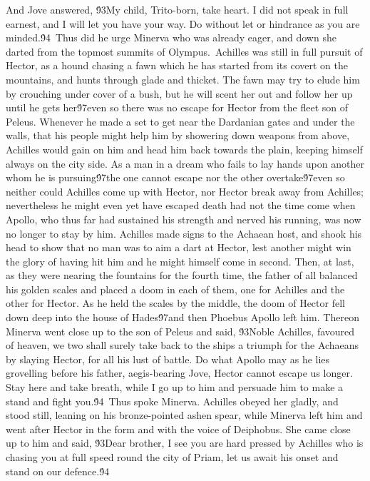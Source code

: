 {And Jove answered, \'93My child, Trito-born, take heart. I did not speak in full earnest, and I will let you have your way. Do without let or hindrance as you are minded.\'94\
Thus did he urge Minerva who was already eager, and down she darted from the topmost summits of Olympus.\
Achilles was still in full pursuit of Hector, as a hound chasing a fawn which he has started from its covert on the mountains, and hunts through glade and thicket. The fawn may try to elude him by crouching under cover of a bush, but he will scent her out and follow her up until he gets her\'97even so there was no escape for Hector from the fleet son of Peleus. Whenever he made a set to get near the Dardanian gates and under the walls, that his people might help him by showering down weapons from above, Achilles would gain on him and head him back towards the plain, keeping himself always on the city side. As a man in a dream who fails to lay hands upon another whom he is pursuing\'97the one cannot escape nor the other overtake\'97even so neither could Achilles come up with Hector, nor Hector break away from Achilles; nevertheless he might even yet have escaped death had not the time come when Apollo, who thus far had sustained his strength and nerved his running, was now no longer to stay by him. Achilles made signs to the Achaean host, and shook his head to show that no man was to aim a dart at Hector, lest another might win the glory of having hit him and he might himself come in second. Then, at last, as they were nearing the fountains for the fourth time, the father of all balanced his golden scales and placed a doom in each of them, one for Achilles and the other for Hector. As he held the scales by the middle, the doom of Hector fell down deep into the house of Hades\'97and then Phoebus Apollo left him. Thereon Minerva went close up to the son of Peleus and said, \'93Noble Achilles, favoured of heaven, we two shall surely take back to the ships a triumph for the Achaeans by slaying Hector, for all his lust of battle. Do what Apollo may as he lies grovelling before his father, aegis-bearing Jove, Hector cannot escape us longer. Stay here and take breath, while I go up to him and persuade him to make a stand and fight you.\'94\
Thus spoke Minerva. Achilles obeyed her gladly, and stood still, leaning on his bronze-pointed ashen spear, while Minerva left him and went after Hector in the form and with the voice of Deiphobus. She came close up to him and said, \'93Dear brother, I see you are hard pressed by Achilles who is chasing you at full speed round the city of Priam, let us await his onset and stand on our defence.\'94\
}

